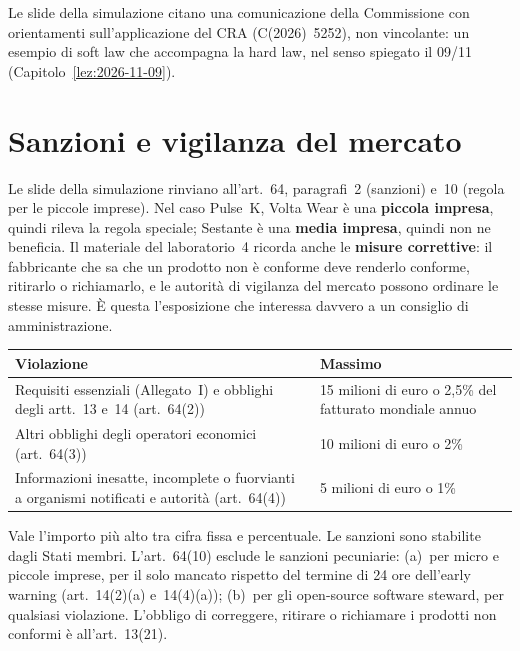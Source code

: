 \begin{integrazione}
Le slide della simulazione citano una comunicazione della Commissione con orientamenti
sull'applicazione del CRA (C(2026)~5252), non vincolante: un esempio di soft law che accompagna la hard
law, nel senso spiegato il 09/11 (Capitolo~\ref{lez:2026-11-09}).
\end{integrazione}

\section{Sanzioni e vigilanza del mercato}
\label{sec:cra-sanzioni}

Le slide della simulazione rinviano all'art.~64, paragrafi~2 (sanzioni) e~10 (regola per le piccole
imprese). Nel caso Pulse~K, Volta Wear è una \textbf{piccola impresa}, quindi rileva la regola speciale;
Sestante è una \textbf{media impresa}, quindi non ne beneficia. Il materiale del laboratorio~4 ricorda
anche le \textbf{misure correttive}: il fabbricante che sa che un prodotto non è conforme deve
renderlo conforme, ritirarlo o richiamarlo, e le autorità di vigilanza del mercato possono ordinare le
stesse misure. È questa l'esposizione che interessa davvero a un consiglio di amministrazione.

\begin{integrazione}
\begin{center}
\small
\begin{tabularx}{\linewidth}{X l}
\toprule
\textbf{Violazione} & \textbf{Massimo}\\
\midrule
Requisiti essenziali (Allegato~I) e obblighi degli artt.~13 e~14 (art.~64(2)) & 15 milioni di euro o
  2,5\% del fatturato mondiale annuo\\
Altri obblighi degli operatori economici (art.~64(3)) & 10 milioni di euro o 2\%\\
Informazioni inesatte, incomplete o fuorvianti a organismi notificati e autorità (art.~64(4)) & 5
  milioni di euro o 1\%\\
\bottomrule
\end{tabularx}
\end{center}
Vale l'importo più alto tra cifra fissa e percentuale. Le sanzioni sono stabilite dagli Stati membri.
L'art.~64(10) esclude le sanzioni pecuniarie: (a)~per micro e piccole imprese, per il solo mancato
rispetto del termine di 24 ore dell'early warning (art.~14(2)(a) e~14(4)(a)); (b)~per gli
open-source software steward, per qualsiasi violazione. L'obbligo di correggere, ritirare o richiamare i
prodotti non conformi è all'art.~13(21).
\end{integrazione}

